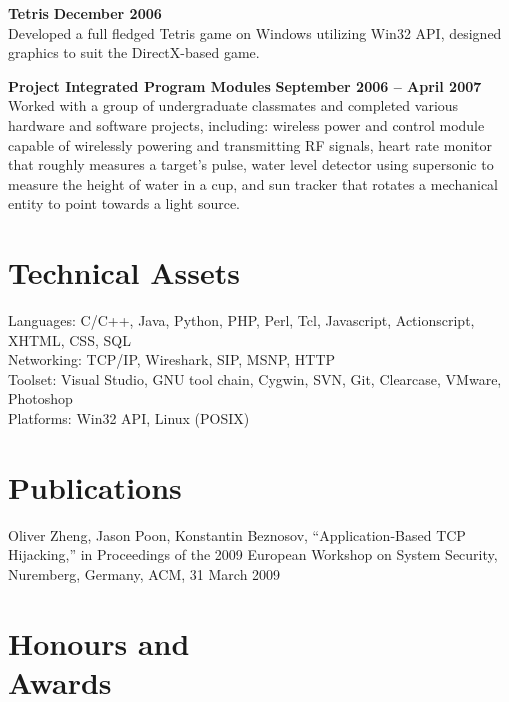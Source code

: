 \documentclass[margin,line]{resume}
\begin{document}
\begin{resume}
    \textbf{Tetris} \hfill \textbf{December 2006} \vspace{2mm}\\\vspace{1mm}%
    Developed a full fledged Tetris game on Windows utilizing Win32 API,
    designed graphics to suit the DirectX-based game.

    \textbf{Project Integrated Program Modules} \hfill \textbf{September 2006 -- April 2007} \vspace{2mm}\\\vspace{1mm}%
    Worked with a group of undergraduate classmates and completed various hardware and software projects, including:
    wireless power and control module capable of wirelessly powering and transmitting RF signals,
    heart rate monitor that roughly measures a target's pulse,
    water level detector using supersonic to measure the height of water in a cup, and
    sun tracker that rotates a mechanical entity to point towards a light source.

    \section{\mysidestyle Technical Assets}
    Languages: C/C++, Java, Python, PHP, Perl, Tcl, Javascript, Actionscript, XHTML, CSS, SQL
        \vspace{1mm}\\
    Networking: TCP/IP, Wireshark, SIP, MSNP, HTTP
        \vspace{1mm}\\
    Toolset: Visual Studio, GNU tool chain, Cygwin, SVN, Git, Clearcase, VMware, Photoshop
        \vspace{1mm}\\
    Platforms: Win32 API, Linux (POSIX)

    \section{\mysidestyle Publications}
    Oliver Zheng, Jason Poon, Konstantin Beznosov, ``Application-Based TCP Hijacking,'' in Proceedings of the 2009 European Workshop on System Security, Nuremberg, Germany, ACM, 31 March 2009

    \section{\mysidestyle Honours and\\Awards} 


\end{resume}
\end{document}
